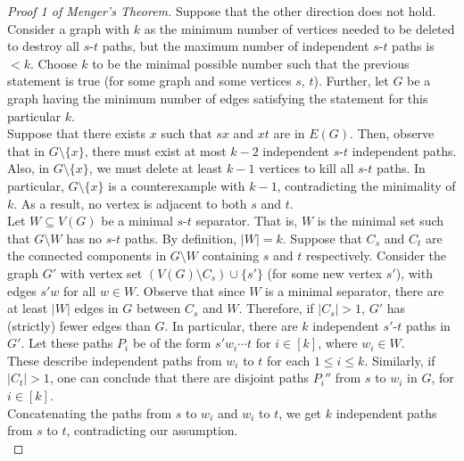 			\begin{proof}[Proof 1 of Menger's Theorem]
				Suppose that the other direction does not hold. Consider a graph with $k$ as the minimum number of vertices needed to be deleted to destroy all $s$-$t$ paths, but the maximum number of independent $s$-$t$ paths is $<k$. Choose $k$ to be the minimal possible number such that the previous statement is true (for some graph and some vertices $s$, $t$). Further, let $G$ be a graph having the minimum number of edges satisfying the statement for this particular $k$.\\

				Suppose that there exists $x$ such that $sx$ and $xt$ are in $E(G)$. Then, observe that in $G \setminus \{x\}$, there must exist at most $k-2$ independent $s$-$t$ independent paths. Also, in $G\setminus \{x\}$, we must delete at least $k-1$ vertices to kill all $s$-$t$ paths. In particular, $G\setminus\{x\}$ is a counterexample with $k-1$, contradicting the minimality of $k$. As a result, no vertex is adjacent to both $s$ and $t$.\\

				Let $W \subseteq V(G)$ be a minimal $s$-$t$ separator. That is, $W$ is the minimal set such that $G\setminus W$ has no $s$-$t$ paths. By definition, $|W| = k$. Suppose that $C_s$ and $C_t$ are the connected components in $G\setminus W$ containing $s$ and $t$ respectively. Consider the graph $G'$ with vertex set $(V(G) \setminus C_s) \cup \{s'\}$ (for some new vertex $s'$), with edges $s'w$ for all $w \in W$. Observe that since $W$ is a minimal separator, there are at least $|W|$ edges in $G$ between $C_s$ and $W$. Therefore, if $|C_s| > 1$, $G'$ has (strictly) fewer edges than $G$. In particular, there are $k$ independent $s'$-$t$ paths in $G'$. Let these paths $P_i$ be of the form $s' w_i \cdots t$ for $i\in[k]$, where $w_i \in W$.\\
				These describe independent paths from $w_i$ to $t$ for each $1 \le i \le k$. Similarly, if $|C_t| > 1$, one can conclude that there are disjoint paths $P_i''$ from $s$ to $w_i$ in $G$, for $i\in[k]$.\\
				Concatenating the paths from $s$ to $w_i$ and $w_i$ to $t$, we get $k$ independent paths from $s$ to $t$, contradicting our assumption.\\


\end{proof}
